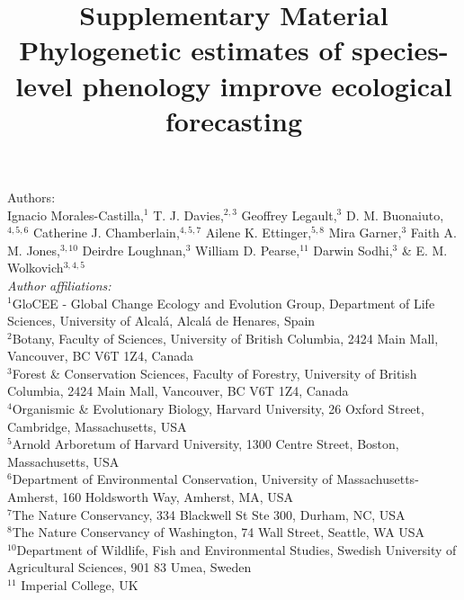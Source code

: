 \documentclass[11pt]{article}
\begin{document}



\title{Supplementary Material\\
Phylogenetic estimates of species-level phenology improve ecological forecasting}
\author{} %
\maketitle


\noindent Authors:\\
Ignacio Morales-Castilla,$^{1}$ T. J. Davies,$^{2,3}$ Geoffrey Legault,$^{3}$ D. M. Buonaiuto,$^{4,5,6}$ Catherine J. Chamberlain,$^{4,5,7}$ Ailene K. Ettinger,$^{5,8}$ Mira Garner,$^{3}$ Faith A. M. Jones,$^{3,10}$ Deirdre Loughnan,$^{3}$ William D. Pearse,$^{11}$ Darwin Sodhi,$^{3}$ \& E. M. Wolkovich$^{3,4,5}$  \vspace{2ex}\\
\emph{Author affiliations:}\\
$^{1}$GloCEE - Global Change Ecology and Evolution Group, Department of Life Sciences, University of Alcal\'a, Alcal\'a de Henares, Spain\\ %
 $^{2}$Botany, Faculty of Sciences, University of British Columbia, 2424 Main Mall, Vancouver, BC V6T 1Z4, Canada\\
$^{3}$Forest \& Conservation Sciences, Faculty of Forestry, University of British Columbia, 2424 Main Mall, Vancouver, BC V6T 1Z4, Canada\\
$^{4}$Organismic \& Evolutionary Biology, Harvard University, 26 Oxford Street, Cambridge, Massachusetts, USA\\
$^{5}$Arnold Arboretum of Harvard University, 1300 Centre Street, Boston, Massachusetts, USA\\
$^{6}$Department of Environmental Conservation, University of Massachusetts-Amherst, 160 Holdsworth Way, Amherst, MA, USA\\  %
 $^{7}$The Nature Conservancy, 334 Blackwell St Ste 300, Durham, NC, USA \\ %
$^{8}$The Nature Conservancy of Washington, 74 Wall Street, Seattle, WA  USA \\ %
$^{10}$Department of Wildlife, Fish and Environmental Studies, Swedish University of Agricultural Sciences, 901 83 Umea, Sweden\\ %
$^{11}$ Imperial College, UK\\
\end{document}
